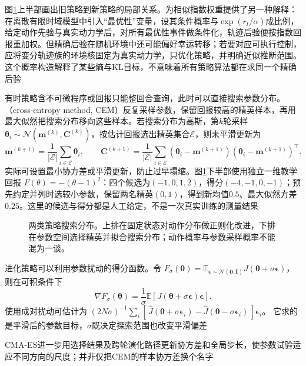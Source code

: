 图\ref{fig:rl-learning-regularized-search}上半部画出旧策略到新策略的局部关系。为相似指数权重提供了另一种解释：在离散有限时域模型中引入“最优性”变量，设其条件概率与$\exp(r_t/\alpha)$成比例，给定动作先验与真实动力学后，对所有最优性事件做条件化，轨迹后验便按指数回报重加权。但精确后验在随机环境中还可能偏好幸运转移；若要对应可执行控制，应将变分轨迹族的环境核固定为真实动力学，只优化策略，并明确近似推断范围。这个概率构造解释了某些熵与KL目标，不意味着所有策略算法都在求同一个精确后验

有时策略含不可微程序或回报只能整回合查询，此时可以直接搜索参数分布。（cross-entropy method, CEM）反复采样参数，保留回报较高的精英样本，再用最大似然把搜索分布移向这些样本。若搜索分布为高斯，第$k$轮采样
$\bm\theta_i\sim\mathcal N(\bm m^{(k)},\bm C^{(k)})$，按估计回报选出精英集合$\mathcal E$，则未平滑更新为
\[
  \bm m^{(k+1)}
       =\frac1{|\mathcal E|}\sum_{i\in\mathcal E}\bm\theta_i,
  \qquad
  \bm C^{(k+1)}
       =\frac1{|\mathcal E|}\sum_{i\in\mathcal E}
       (\bm\theta_i-\bm m^{(k+1)})
       (\bm\theta_i-\bm m^{(k+1)})^\top.
\]
实际可设置最小协方差或平滑更新，防止过早塌缩。图\ref{fig:rl-learning-regularized-search}下半部使用独立一维教学回报
$F(\theta)=-(\theta-1)^2$：四个候选为$(-1,0,1,2)$，得分$(-4,-1,0,-1)$；预先约定并列时选较小参数，保留两名精英$(0,1)$，得到新均值$0.5$、最大似然方差$0.25$。这里的候选与得分都是人工给定，不是一次真实训练的测量结果

\begin{figure}[t]
  \centering
  
  \caption{两类策略搜索分布。上排在固定状态对动作分布做正则化改进，下排在参数空间选择精英并拟合搜索分布；动作概率与参数采样概率不能混为一谈。}
  \label{fig:rl-learning-regularized-search}
\end{figure}

进化策略可以利用参数扰动的得分函数。令
$F_\sigma(\bm\theta)=
\mathbb E_{\bm\epsilon\sim\mathcal N(\bm0,\bm I)}
J(\bm\theta+\sigma\bm\epsilon)$，则在可积条件下
\[
  \nabla F_\sigma(\bm\theta)
    =\frac1{\sigma}\mathbb E[J(\bm\theta+\sigma\bm\epsilon)\bm\epsilon].
\]
使用成对扰动可估计为
$(2N\sigma)^{-1}\sum_i
[\,\widehat J(\bm\theta+\sigma\bm\epsilon_i)
-\widehat J(\bm\theta-\sigma\bm\epsilon_i)\,]\bm\epsilon_i$。
它求的是平滑后的参数目标，$\sigma$既决定探索范围也改变平滑偏差

CMA-ES进一步用选择结果及跨轮演化路径更新协方差和全局步长，使参数试验适应不同方向的尺度；并非仅把CEM的样本协方差换个名字

